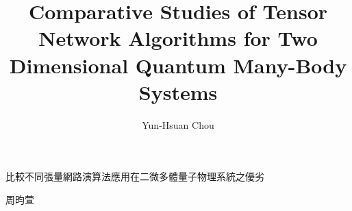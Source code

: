 

\title{Comparative Studies of Tensor Network Algorithms for Two Dimensional Quantum Many-Body Systems}{比較不同張量網路演算法應用在二微多體量子物理系統之優劣}
\author{Yun-Hsuan Chou}{周昀萱}
